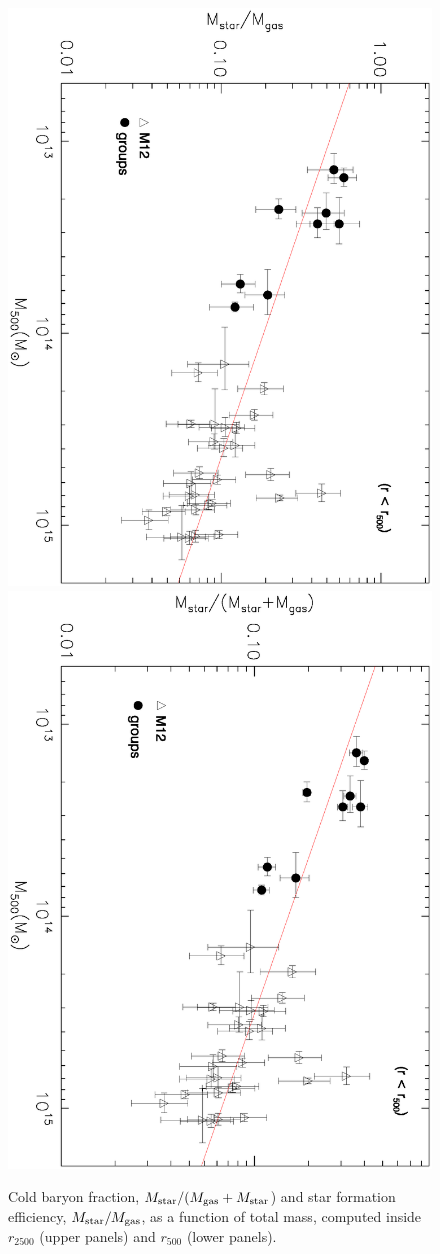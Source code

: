 \documentclass{aa}
\begin{document}
\begin{figure}[ht]
\includegraphics[angle=90,width=9.cm]{Efficiency_r500_Novo.ps}
\includegraphics[angle=90,width=9.cm]{Coldbaryons_r500_Novo.ps}
\caption{Cold baryon fraction, $M_{\rm star}/(M_{\rm gas}+M_{\rm star}$) and star formation efficiency, 
$M_{\rm star}/M_{\rm gas}$, as a function of total mass, computed inside $r_{2500}$ 
(upper panels) and $r_{500}$ (lower panels).}
\label{fig:efficiency}
\end{figure}
\end{document}
